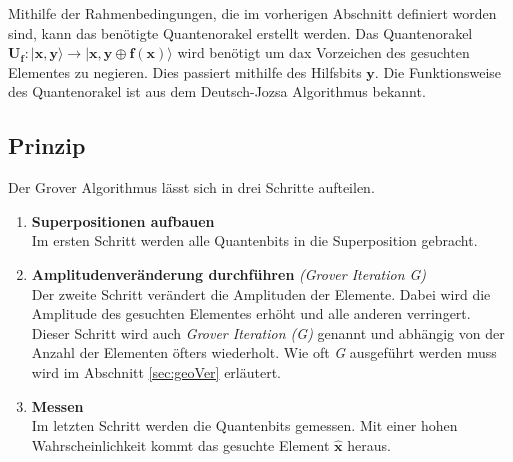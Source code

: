 Mithilfe der Rahmenbedingungen, die im vorherigen Abschnitt definiert worden sind, kann das benötigte Quantenorakel erstellt werden. Das Quantenorakel $\mathbf{U_f : | x,y \rangle \to |x,y \oplus f(x) \rangle}$ wird benötigt um dax Vorzeichen des gesuchten Elementes zu negieren. Dies passiert mithilfe des Hilfsbits $\mathbf{y}$. Die Funktionsweise des Quantenorakel ist aus dem Deutsch-Jozsa Algorithmus bekannt.

\subsection{Prinzip}
Der Grover Algorithmus lässt sich in drei Schritte aufteilen.
\begin{enumerate}
	\item \textbf{Superpositionen aufbauen}
	\\
	Im ersten Schritt werden alle Quantenbits in die Superposition gebracht.
	\item \textbf{Amplitudenveränderung durchführen} \emph{(Grover Iteration G)}
	\\
	Der zweite Schritt verändert die Amplituden der Elemente. Dabei wird die Amplitude des gesuchten Elementes erhöht und alle anderen verringert. Dieser Schritt wird auch \emph{Grover Iteration (G)} genannt und abhängig von der Anzahl der Elementen öfters wiederholt. Wie oft \emph{G} ausgeführt werden muss wird im Abschnitt \ref{sec:geoVer} erläutert.
	\item \textbf{Messen} 
	\\
	Im letzten Schritt werden die Quantenbits gemessen. Mit einer hohen Wahrscheinlichkeit kommt das gesuchte Element $\mathbf{\hat x}$ heraus.
\end{enumerate}

